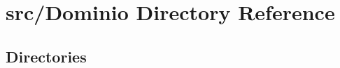 \section{src/\+Dominio Directory Reference}
\label{dir_ce9b9e43f3ecf4c54b4b888d7672d63a}
\subsection*{Directories}
\begin{DoxyCompactItemize}
\end{DoxyCompactItemize}
